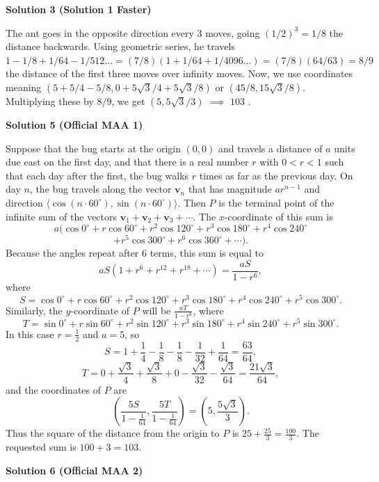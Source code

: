 \begin{enumerate}
 



\textbf{Solution 3 (Solution 1 Faster)}

The ant goes in the opposite direction every $3$ moves, going $(1/2)^3=1/8$ the distance backwards. Using geometric series, he travels $1-1/8+1/64-1/512...=(7/8)(1+1/64+1/4096...)=(7/8)(64/63)=8/9$ the distance of the first three moves over infinity moves. Now, we use coordinates meaning $(5+5/4-5/8, 0+5\sqrt3/4+5\sqrt3/8)$ or $(45/8, 15\sqrt3/8)$. Multiplying these by $8/9$, we get $(5, 5\sqrt3/3)$ $\implies$ $\boxed{103}$ .

 



\textbf{Solution 5 (Official MAA 1)}

Suppose that the bug starts at the origin $(0,0)$ and travels a distance of $a$ units due east on the first day, and that there is a real number $r$ with $0<r < 1$ such that each day after the first, the bug walks $r$ times as far as the previous day. On day $n$, the bug travels along the vector $\pmb v_{n}$ that has magnitude $ar^{n-1}$ and direction $\langle\cos(n\cdot 60^\circ),\sin(n\cdot 60^\circ)\rangle$. Then $P$ is the terminal point of the infinite sum of the vectors $\pmb v_{1}+\pmb v_{2}+\pmb v_3+\cdots$. The $x$-coordinate of this sum is
 \[a\big(\!\cos0^\circ+r\cos60^\circ + r^{2}\cos120^\circ+r^{3}\cos180^\circ+r^{4}\cos240^\circ\]
 \[+r^{5}\cos300^\circ+r^{6}\cos360^\circ+\cdots\big).\]Because the angles repeat after 6 terms, this sum is equal to
 \[aS(1+r^{6}+r^{12}+r^{18}+\cdots)=\frac{aS}{1-r^{6}},\]where
 \[S=\cos0^\circ+r\cos60^\circ + r^{2}\cos120^\circ+r^{3}\cos180^\circ+r^{4}\cos240^\circ+ r^{5}\cos300^\circ.\]Similarly, the $y$-coordinate of $P$ will be ${\frac{aT}{1-r^{6}}}$, where
 \[T=\sin0^\circ+r\sin60^\circ + r^{2}\sin120^\circ+r^{3}\sin180^\circ+r^{4}\sin240^\circ+ r^{5}\sin300^\circ.\]In this case $r=\frac12$ and $a = 5$, so
 \[S=1+\frac14-\frac18-\frac18-\frac1{32}+\frac1{64}=\frac{63}{64},\]
 \[T=0+\frac{\sqrt3}4+\frac{\sqrt3}8+0-\frac{\sqrt3}{32}-\frac{\sqrt3}{64}=\frac{21\sqrt3}{64},\]and the coordinates of $P$ are
 \[\left(\frac{5S}{1-\frac1{64}}, \frac{5T}{1-\frac1{64}}\right)=\left(5,\frac{5\sqrt3}{3}\right).\]Thus the square of the distance from the origin to $P$ is $25+\frac{25}3=\frac{100}3$. The requested sum is $100+3=\boxed{103}$.

 



\textbf{Solution 6 (Official MAA 2)}


\end{enumerate}
